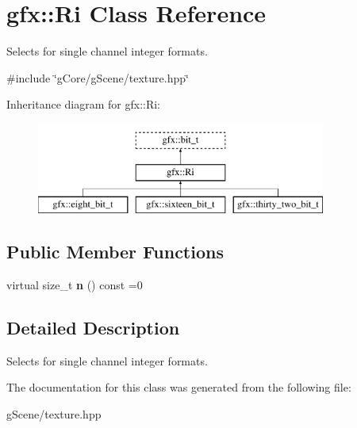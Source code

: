 \hypertarget{classgfx_1_1Ri}{\section{gfx\-:\-:Ri Class Reference}
\label{classgfx_1_1Ri}
}


Selects for single channel integer formats.  




{\ttfamily \#include \char`\"{}g\-Core/g\-Scene/texture.\-hpp\char`\"{}}

Inheritance diagram for gfx\-:\-:Ri\-:\begin{figure}[H]
\begin{center}
\leavevmode
\includegraphics[height=3.000000cm]{classgfx_1_1Ri}
\end{center}
\end{figure}
\subsection*{Public Member Functions}
\begin{DoxyCompactItemize}
\item 
\hypertarget{classgfx_1_1Ri_a7c8820a50a664d7cb2bd28606943897d}{virtual size\-\_\-t {\bfseries n} () const =0}\label{classgfx_1_1Ri_a7c8820a50a664d7cb2bd28606943897d}

\end{DoxyCompactItemize}


\subsection{Detailed Description}
Selects for single channel integer formats. 

The documentation for this class was generated from the following file\-:\begin{DoxyCompactItemize}
\item 
g\-Scene/texture.\-hpp\end{DoxyCompactItemize}
